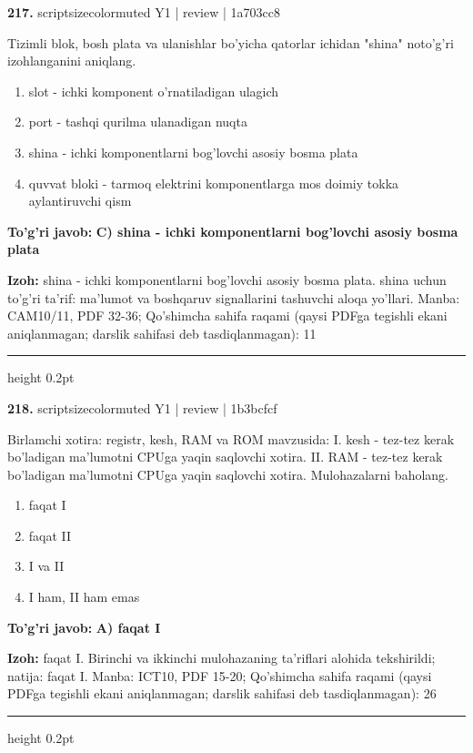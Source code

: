 \documentclass[10pt,a4paper]{article}
\begin{document}
{\bfseries\sffamily\color{ink} 217.} {scriptsizecolor{muted} Y1 | review | 1a703cc8}
\par
Tizimli blok, bosh plata va ulanishlar bo'yicha qatorlar ichidan "shina" noto'g'ri izohlanganini aniqlang.
\begin{enumerate}[label=\Alph*),leftmargin=9mm]
\item slot - ichki komponent o'rnatiladigan ulagich
\item port - tashqi qurilma ulanadigan nuqta
\item shina - ichki komponentlarni bog'lovchi asosiy bosma plata
\item quvvat bloki - tarmoq elektrini komponentlarga mos doimiy tokka aylantiruvchi qism
\end{enumerate}
\begin{tcolorbox}[enhanced,breakable,colback=teal!4,colframe=teal!60!black,boxrule=0.45pt,arc=1.2mm,left=2.7mm,right=2.7mm,top=1.8mm,bottom=1.8mm,before skip=2mm,after skip=2mm]
{\bfseries\sffamily\color{teal}To'g'ri javob:} \textbf{C) shina - ichki komponentlarni bog'lovchi asosiy bosma plata}
\par\smallskip
{\bfseries Izoh:} shina - ichki komponentlarni bog'lovchi asosiy bosma plata. shina uchun to'g'ri ta'rif: ma'lumot va boshqaruv signallarini tashuvchi aloqa yo'llari. Manba: CAM10/11, PDF 32-36; Qo'shimcha sahifa raqami (qaysi PDFga tegishli ekani aniqlanmagan; darslik sahifasi deb tasdiqlanmagan): 11
\end{tcolorbox}
\vspace{2mm}\hrule height 0.2pt\vspace{3mm}

{\bfseries\sffamily\color{ink} 218.} {scriptsizecolor{muted} Y1 | review | 1b3bcfcf}
\par
Birlamchi xotira: registr, kesh, RAM va ROM mavzusida: I. kesh - tez-tez kerak bo'ladigan ma'lumotni CPUga yaqin saqlovchi xotira. II. RAM - tez-tez kerak bo'ladigan ma'lumotni CPUga yaqin saqlovchi xotira. Mulohazalarni baholang.
\begin{enumerate}[label=\Alph*),leftmargin=9mm]
\item faqat I
\item faqat II
\item I va II
\item I ham, II ham emas
\end{enumerate}
\begin{tcolorbox}[enhanced,breakable,colback=teal!4,colframe=teal!60!black,boxrule=0.45pt,arc=1.2mm,left=2.7mm,right=2.7mm,top=1.8mm,bottom=1.8mm,before skip=2mm,after skip=2mm]
{\bfseries\sffamily\color{teal}To'g'ri javob:} \textbf{A) faqat I}
\par\smallskip
{\bfseries Izoh:} faqat I. Birinchi va ikkinchi mulohazaning ta'riflari alohida tekshirildi; natija: faqat I. Manba: ICT10, PDF 15-20; Qo'shimcha sahifa raqami (qaysi PDFga tegishli ekani aniqlanmagan; darslik sahifasi deb tasdiqlanmagan): 26
\end{tcolorbox}
\vspace{2mm}\hrule height 0.2pt\vspace{3mm}
\end{document}
